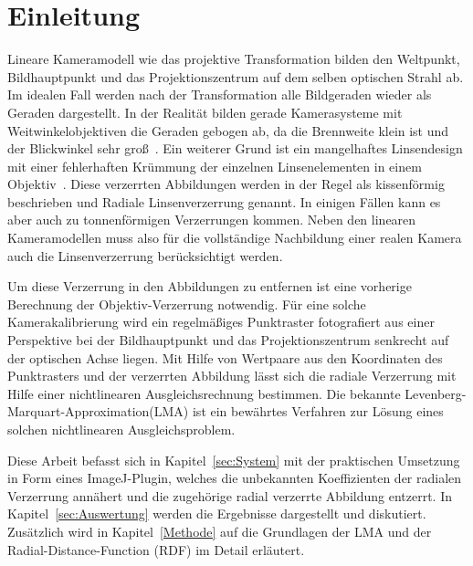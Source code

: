 \section{Einleitung}\label{sec:Introduction}
Lineare Kameramodell wie das projektive Transformation bilden den Weltpunkt, Bildhauptpunkt und das Projektionszentrum auf dem selben optischen Strahl ab. Im idealen Fall werden nach der Transformation alle Bildgeraden wieder als Geraden dargestellt. In der Realität bilden gerade Kamerasysteme mit Weitwinkelobjektiven die Geraden gebogen ab, da die Brennweite klein ist und der Blickwinkel sehr groß~\cite{HartleyRadDist}. Ein weiterer Grund ist ein mangelhaftes Linsendesign mit einer fehlerhaften Krümmung der einzelnen Linsenelementen in einem Objektiv~\cite{WengRadDist}\cite{Zhang:1996:EGT:844381.845228}. Diese verzerrten Abbildungen werden in der Regel als kissenförmig beschrieben und Radiale Linsenverzerrung genannt. In einigen Fällen kann es aber auch zu tonnenförmigen Verzerrungen kommen. Neben den linearen Kameramodellen muss also für die vollständige Nachbildung einer realen Kamera auch die Linsenverzerrung berücksichtigt werden. 

Um diese Verzerrung in den Abbildungen zu entfernen ist eine vorherige Berechnung der Objektiv-Verzerrung notwendig. Für eine solche Kamerakalibrierung wird ein regelmäßiges Punktraster fotografiert aus einer Perspektive bei der Bildhauptpunkt und das Projektionszentrum senkrecht auf der optischen Achse liegen. 
Mit Hilfe von Wertpaare aus den Koordinaten des Punktrasters und der verzerrten Abbildung lässt sich die radiale Verzerrung mit Hilfe einer nichtlinearen Ausgleichsrechnung bestimmen. Die bekannte Levenberg-Marquart-Approximation(LMA) ist ein bewährtes Verfahren zur Lösung eines solchen nichtlinearen Ausgleichsproblem.

Diese Arbeit befasst sich in Kapitel~\ref{sec:System} mit der praktischen Umsetzung in Form eines ImageJ-Plugin, welches die unbekannten Koeffizienten der radialen Verzerrung annähert und die zugehörige radial verzerrte Abbildung entzerrt. In Kapitel~\ref{sec:Auswertung} werden die Ergebnisse dargestellt und diskutiert. Zusätzlich wird in Kapitel~\ref{Methode} auf die Grundlagen der LMA und der Radial-Distance-Function (RDF) im Detail erläutert.
























